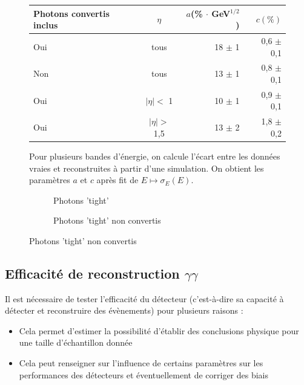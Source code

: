 \documentclass[11pt]{article} %
\begin{document}
\begin{figure}[H]
\centering
\begin{tabular}{|l|c|r|r|} 
   \hline
   Photons convertis inclus &$\eta$ & $a$(\% $\cdot$ GeV${ }^{1/2}$) & $c (\%)$ \\
    \hline
   Oui & tous & 18  $\pm$ 1  &0,6  $\pm$ 0,1  \\
  \hline
   Non & tous & 13  $\pm$ 1  &0,8  $\pm$ 0,1  \\
  \hline
   Oui &$|\eta| < $ 1 & 10  $\pm$ 1  &0,9  $\pm$ 0,1  \\
\hline
   Oui & $|\eta| >$ 1,5 & 13  $\pm$ 2  &1,8  $\pm$ 0,2  \\
\hline
\end{tabular}
\caption{ Pour plusieurs bandes d'énergie, on calcule l'écart entre les données vraies et reconstruites à partir d'une simulation. On obtient les paramètres $a$ et $c$ après fit de $E \mapsto \sigma_E(E)$.  }
\label{fig:resolution_energie_photons_tab} 
\end{figure}

\begin{figure}[H]
\begin{subfigure}[b]{.5\linewidth}
\centering
  \caption{Photons 'tight' }
\label{fig:resolution_energie_photons} 
 \resizebox{1.1\linewidth}{!}{}
\end{subfigure}
\begin{subfigure}[b]{.5\linewidth}
\centering
  \caption{Photons 'tight' non convertis} 
 \resizebox{1.1\linewidth}{!}{}
\end{subfigure}
\end{figure}

\subsection{Efficacité de reconstruction $\gamma\gamma$}

Il est nécessaire de tester l'efficacité du détecteur (c'est-à-dire sa capacité à détecter et reconstruire des évènements) pour plusieurs raisons :

\begin{itemize}
\item{Cela permet d'estimer la possibilité d'établir des conclusions physique pour une taille d'échantillon donnée}
\item{Cela peut renseigner sur l'influence de certains paramètres sur les performances des détecteurs et éventuellement de corriger des biais}
\end{itemize}
\end{document}
